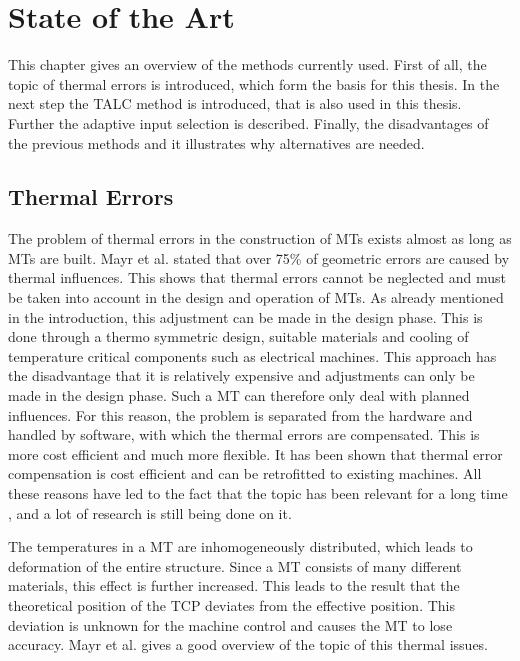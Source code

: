 \chapter{State of the Art}
\label{chp:stateoftheart}

This chapter gives an overview of the methods currently used. First of all, the topic of thermal errors is introduced, which form the basis for this thesis. In the next step the TALC method is introduced, that is also used in this thesis. Further the adaptive input selection is described. Finally, the disadvantages of the previous methods and it illustrates why alternatives are needed.

\section{Thermal Errors}
\label{sec:thermalerrors}

The problem of thermal errors in the construction of MTs exists almost as long as MTs are built. Mayr et al. \cite{Mayr_2012} stated that over 75\% of geometric errors are caused by thermal influences. This shows that thermal errors cannot be neglected and must be taken into account in the design and operation of MTs. As already mentioned in the introduction, this adjustment can be made in the design phase. This is done through a thermo symmetric design, suitable materials and cooling of temperature critical components such as electrical machines. This approach has the disadvantage that it is relatively expensive and adjustments can only be made in the design phase. Such a MT can therefore only deal with planned influences. For this reason, the problem is separated from the hardware and handled by software, with which the thermal errors are compensated. This is more cost efficient and much more flexible. It has been shown that thermal error compensation is cost efficient and can be retrofitted to existing machines.  All these reasons have led to the fact that the topic has been relevant for a long time \cite{Yang_1996}, and a lot of research is still being done on it.

The temperatures in a MT are inhomogeneously distributed, which leads to deformation of the entire structure. Since a MT consists of many different materials, this effect is further increased. This leads to the result that the theoretical position of the TCP deviates from the effective position. This deviation is unknown for the machine control and causes the MT to lose accuracy. Mayr et al. \cite{Mayr_2012} gives a good overview of the topic of this thermal issues.

